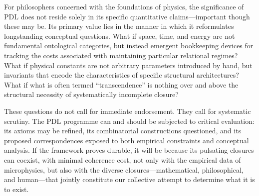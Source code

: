 \documentclass{article}
\theoremstyle{definition}
\newcommand{\PDL}{\ensuremath{\mathrm{PDL}}}
\begin{document}
For philosophers concerned with the foundations of physics, the significance of \PDL{} does not reside solely in its specific quantitative claims—important though these may be.
Its primary value lies in the manner in which it reformulates longstanding conceptual questions.
What if space, time, and energy are not fundamental ontological categories, but instead emergent bookkeeping devices for tracking the costs associated with maintaining particular relational regimes?
What if physical constants are not arbitrary parameters introduced by hand, but invariants that encode the characteristics of specific structural architectures?
What if what is often termed “transcendence” is nothing over and above the structural necessity of systematically incomplete closure?

These questions do not call for immediate endorsement.
They call for systematic scrutiny.
The \PDL{} programme can and should be subjected to critical evaluation: its axioms may be refined, its combinatorial constructions questioned, and its proposed correspondences exposed to both empirical constraints and conceptual analysis.%
\cite{PDL_Position_2026}
If the framework proves durable, it will be because its pulsating closures can coexist, with minimal coherence cost, not only with the empirical data of microphysics, but also with the diverse closures—mathematical, philosophical, and human—that jointly constitute our collective attempt to determine what it is to exist.



\end{document}
